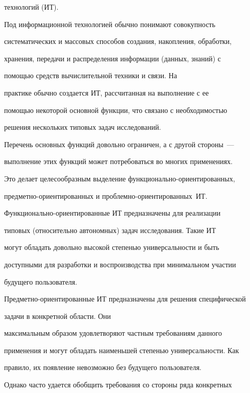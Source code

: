 технологий (ИТ).





Под информационной технологией обычно понимают совокупность


систематических и массовых способов создания, накопления, обработки,


хранения, передачи и распределения информации (данных, знаний) с


помощью средств вычислительной техники и связи. На


практике обычно создается ИТ, рассчитанная на выполнение с ее


помощью некоторой основной функции, что связано с необходимостью


решения нескольких типовых задач исследований.


Перечень основных функций довольно ограничен, а с другой стороны~---


выполнение этих функций может потребоваться во многих применениях.


Это делает целесообразным выделение функ\-ци\-о\-наль\-но-ориенти\-ро\-ван\-ных,


пред\-мет\-но-ориенти\-ро\-ван\-ных и проб\-лем\-но-ориенти\-ро\-ван\-ных~ИТ.





Функционально-ориентированные ИТ предназначены для реализации


типовых (относительно автономных) задач исследования. Такие ИТ


могут обладать довольно высокой степенью универсальности и быть


доступными для разработки и воспроизводства при минимальном участии


будущего пользователя.





Предметно-ориентированные ИТ предназначены для решения специфической


задачи в конкретной области. Они


максимальным образом удовлетворяют частным требованиям данного


применения и могут обладать наименьшей сте\-пенью универсальности. Как


правило, их появление невозможно без будущего пользователя.





Однако часто удается обобщить требования со стороны ряда конкретных


